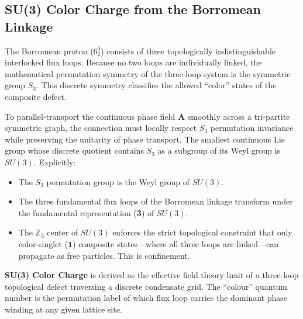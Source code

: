 \subsection{SU(3) Color Charge from the Borromean Linkage}
The Borromean proton ($6^3_2$) consists of three topologically indistinguishable interlocked flux loops. Because no two loops are individually linked, the mathematical permutation symmetry of the three-loop system is the symmetric group $S_3$. This discrete symmetry classifies the allowed ``color'' states of the composite defect.

To parallel-transport the continuous phase field $\mathbf{A}$ smoothly across a tri-partite symmetric graph, the connection must locally respect $S_3$ permutation invariance while preserving the unitarity of phase transport. The smallest continuous Lie group whose discrete quotient contains $S_3$ as a subgroup of its Weyl group is $SU(3)$. Explicitly:
\begin{itemize}
    \item The $S_3$ permutation group is the Weyl group of $SU(3)$.
    \item The three fundamental flux loops of the Borromean linkage transform under the fundamental representation (\textbf{3}) of $SU(3)$.
    \item The $\mathbb{Z}_3$ center of $SU(3)$ enforces the strict topological constraint that only color-singlet ($\mathbf{1}$) composite states---where all three loops are linked---can propagate as free particles. This is confinement.
\end{itemize}

\textbf{SU(3) Color Charge} is derived as the effective field theory limit of a three-loop topological defect traversing a discrete condensate grid. The ``colour'' quantum number is the permutation label of which flux loop carries the dominant phase winding at any given lattice site.